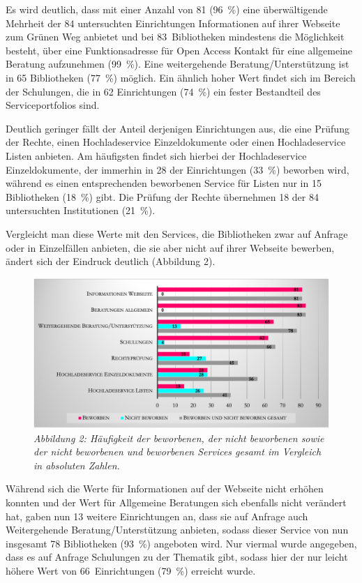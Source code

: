 \documentclass[a4paper,
fontsize=11pt,
oneside,
numbers=noperiodatend,
parskip=half-,
bibliography=totoc,
final
]{scrartcl}
\begin{document}
Es wird deutlich, dass mit einer Anzahl von 81 (96~\%) eine
überwältigende Mehrheit der 84 untersuchten Einrichtungen Informationen
auf ihrer Webseite zum Grünen Weg anbietet und bei 83~Bibliotheken
mindestens die Möglichkeit besteht, über eine Funktionsadresse für Open
Access Kontakt für eine allgemeine Beratung aufzunehmen (99~\%). Eine
weitergehende Beratung/Unterstützung ist in 65 Bibliotheken (77~\%)
möglich. Ein ähnlich hoher Wert findet sich im Bereich der Schulungen,
die in 62 Einrichtungen (74~\%) ein fester Bestandteil des
Serviceportfolios sind.

Deutlich geringer fällt der Anteil derjenigen Einrichtungen aus, die
eine Prüfung der Rechte, einen Hochladeservice Einzeldokumente oder
einen Hochladeservice Listen anbieten. Am häufigsten findet sich hierbei
der Hochladeservice Einzeldokumente, der immerhin in 28 der
Einrichtungen (33~\%) beworben wird, während es einen entsprechenden
beworbenen Service für Listen nur in 15 Bibliotheken (18~\%) gibt. Die
Prüfung der Rechte übernehmen 18 der 84 untersuchten Institutionen
(21~\%).

Vergleicht man diese Werte mit den Services, die Bibliotheken zwar auf
Anfrage oder in Einzelfällen anbieten, die sie aber nicht auf ihrer
Webseite bewerben, ändert sich der Eindruck deutlich (Abbildung 2).

\begin{figure}[h!]
\centering
\includegraphics[width=.9\textwidth]{img/abb2.png}
\caption{\textit{Abbildung 2: Häufigkeit der beworbenen, der nicht beworbenen
sowie der nicht beworbenen und beworbenen Services gesamt im Vergleich
in absoluten Zahlen.}}
\end{figure}

Während sich die Werte für Informationen auf der Webseite nicht erhöhen
konnten und der Wert für Allgemeine Beratungen sich ebenfalls nicht
verändert hat, gaben nun 13 weitere Einrichtungen an, dass sie auf
Anfrage auch Weitergehende Beratung/Unterstützung anbieten, sodass
dieser Service von nun insgesamt 78 Bibliotheken (93~\%) angeboten wird.
Nur viermal wurde angegeben, dass es auf Anfrage Schulungen zu der
Thematik gibt, sodass hier der nur leicht höhere Wert von
66~Einrichtungen (79~\%) erreicht wurde.
\end{document}
